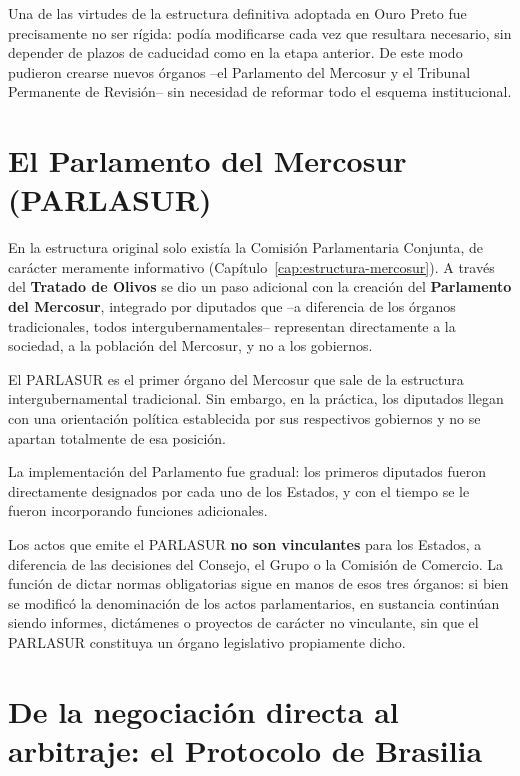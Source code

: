 \documentclass[12pt,oneside]{book}
\begin{document}
Una de las virtudes de la estructura definitiva adoptada en Ouro Preto fue precisamente no ser rígida: podía modificarse cada vez que resultara necesario, sin depender de plazos de caducidad como en la etapa anterior. De este modo pudieron crearse nuevos órganos --el Parlamento del Mercosur y el Tribunal Permanente de Revisión-- sin necesidad de reformar todo el esquema institucional.

\section{El Parlamento del Mercosur (PARLASUR)}

En la estructura original solo existía la Comisión Parlamentaria Conjunta, de carácter meramente informativo (Capítulo~\ref{cap:estructura-mercosur}). A través del \textbf{Tratado de Olivos} se dio un paso adicional con la creación del \textbf{Parlamento del Mercosur}, integrado por diputados que --a diferencia de los órganos tradicionales, todos intergubernamentales-- representan directamente a la sociedad, a la población del Mercosur, y no a los gobiernos.

\begin{importante}
El PARLASUR es el primer órgano del Mercosur que sale de la estructura intergubernamental tradicional. Sin embargo, en la práctica, los diputados llegan con una orientación política establecida por sus respectivos gobiernos y no se apartan totalmente de esa posición.
\end{importante}

La implementación del Parlamento fue gradual: los primeros diputados fueron directamente designados por cada uno de los Estados, y con el tiempo se le fueron incorporando funciones adicionales.

\begin{importante}
Los actos que emite el PARLASUR \textbf{no son vinculantes} para los Estados, a diferencia de las decisiones del Consejo, el Grupo o la Comisión de Comercio. La función de dictar normas obligatorias sigue en manos de esos tres órganos: si bien se modificó la denominación de los actos parlamentarios, en sustancia continúan siendo informes, dictámenes o proyectos de carácter no vinculante, sin que el PARLASUR constituya un órgano legislativo propiamente dicho.
\end{importante}

\section{De la negociación directa al arbitraje: el Protocolo de Brasilia}
\end{document}
